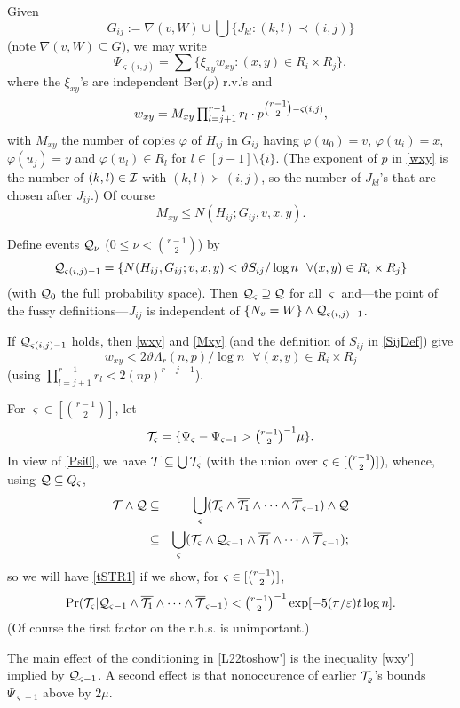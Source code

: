 \documentclass[letterpaper,11pt]{article}
\newcommand{\beq}[1]{\begin{equation}\label{#1}}
\newcommand{\enq}[0]{\end{equation}}
\newcommand{\sub}[0]{\subseteq}
\newcommand{\sm}[0]{\setminus}
\newcommand{\ov}[0]{\overline}
\newcommand{\I}[0]{{\cal I}}
\newcommand{\Q}[0]{{\cal Q}}
\newcommand{\T}[0]{{\cal T}}
\newcommand{\0}[0]{\emptyset}
\newcommand{\C}[2]{{{#1}\choose{{#2}}}}
\newcommand{\Cc}[0]{\tbinom}
\newcommand{\gL}[0]{\Lambda}
\newcommand{\eps}[0]{\varepsilon }
\newcommand{\vt}[0]{\vartheta}
\newcommand{\vs}[0]{\varsigma}
\newcommand{\vp}[0]{\varphi}
\newcommand{\glr}[0]{\gL_r(n,p)}
\begin{document}
Given
\[
G_{ij}:=\nabla(v,W)\cup \bigcup\{J_{kl}:(k,l)\prec (i,j)\}
\]
(note $\nabla(v,W)\sub G$),
we may write
\beq{Psivs}
\Psi_{\vs(i,j)}= \sum\{\xi_{xy}w_{xy}:(x,y)\in R_i\times R_j\},
\enq
where the $\xi_{xy}$'s are independent Ber($p$) r.v.'s and
\beq{wxy}
\mbox{$w_{xy} = M_{xy}\prod_{l=j+1}^{r-1}r_l \cdot
p^{\Cc{r-1}{2}-\vs(i,j)}$,}
\enq
with $M_{xy}$ the number of copies $\vp$ of $H_{ij}$
in
$
G_{ij}$
having
$\vp(u_0)=v$, $\vp(u_i)=x$, $\vp(u_j)=y$
and $\vp(u_l)\in R_l$ for $l\in [j-1]\sm \{i\}$.
(The exponent of $p$ in \eqref{wxy} is the number of
$(k,l)\in \I$ with $(k,l)\succ (i,j)$,
so the number of $J_{kl}$'s that are chosen after $J_{ij}$.)
%
Of course
\beq{Mxy}
M_{xy}\leq N(H_{ij}; G_{ij},v,x,y).   %
\enq

Define events $\Q_\nu$ ($0\leq \nu < \C{r-1}{2}$) by
\beq{Qvsij}
\Q_{\vs(i,j)-1}=
\{N(H_{ij},G_{ij};v,x,y)< \vt S_{ij}/\log n
~~\forall (x,y)\in R_i\times R_j\}
\enq
(with $\Q_0$ the full probability space).
Then
$\Q_\vs\supseteq \Q$ for all $\vs$
and---the point of the
fussy definitions---$J_{ij}$ is independent of
$\{N_v=W\}\wedge \Q_{\vs(i,j)-1}$.

If $\Q_{\vs(i,j)-1}$ holds, then \eqref{wxy} and \eqref{Mxy}
(and the definition
of $S_{ij}$ in \eqref{SijDef}) give
\beq{wxy'}
w_{xy}< 2\vt \glr/\log n
~~~\forall (x,y)\in R_i\times R_j
\enq
(using
$\prod_{l=j+1}^{r-1}r_l < 2(np)^{r-j-1}$).



\medskip
For $\vs \in [\C{r-1}{2}]$,
let
\[
\T_\vs = \{\Psi_\vs-\Psi_{\vs-1}> \Cc{r-1}{2}^{-1}\mu\}.
\]
%
In view of \eqref{Psi0}, we have $\T \sub \bigcup \T_\vs$
(with the union over $\vs\in [\Cc{r-1}{2}]$), whence,
using $\Q\sub Q_\vs$,
\begin{eqnarray*}
\T\wedge \Q &\sub&
\bigcup_\vs(\T_\vs
\wedge \ov{\T_1}\wedge \cdots \wedge \ov{\T}_{\vs-1})\wedge \Q\\
&\sub &\bigcup_\vs(\T_\vs\wedge \Q_{\vs-1}
\wedge \ov{\T_1}\wedge \cdots \wedge \ov{\T}_{\vs-1});
\end{eqnarray*}
so we
will have \eqref{tSTR1} if we show, for $\vs\in [\Cc{r-1}{2}]$,
%
\beq{L22toshow'}
\Pr(\T_\vs|\Q_{\vs-1}
\wedge\ov{\T_1}\wedge\cdots \wedge\ov{\T}_{\vs-1})
< \Cc{r-1}{2}^{-1} \exp[- 5(\pi/\eps) t \log n].
\enq
(Of course the first factor on the r.h.s. is unimportant.)


The main effect of
the conditioning in \eqref{L22toshow'} is the inequality
\eqref{wxy'}
implied by $\Q_{\vs-1}$.
A second effect
is that nonoccurence of earlier $\T_\varrho$'s bounds
$\Psi_{\vs-1}$ above by
$2\mu$.
\end{document}
